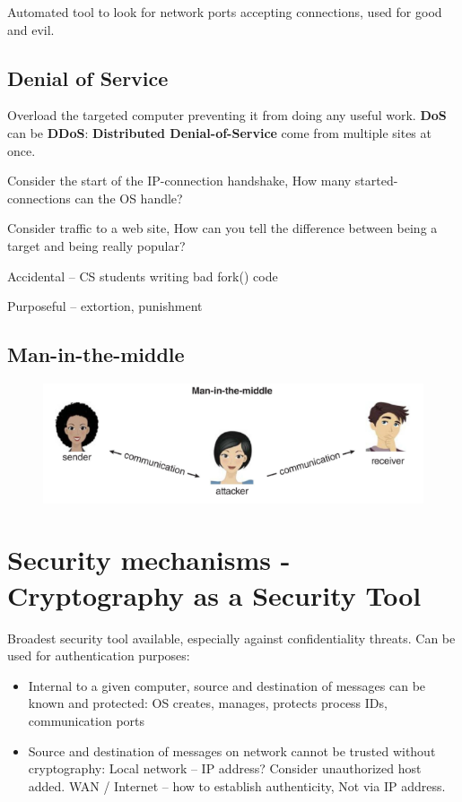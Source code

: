 Automated tool to look for network ports accepting connections, used for good and evil.

\subsection{Denial of Service}

Overload the targeted computer preventing it from doing any useful
work. \textbf{DoS} can be \textbf{DDoS}: \textbf{Distributed Denial-of-Service} come from multiple sites at
once.

Consider the start of the IP-connection handshake, How many started-connections can the OS handle?

Consider traffic to a web site, How can you tell the difference between being a target and
being really popular?

Accidental – CS students writing bad fork() code

Purposeful – extortion, punishment

\subsection{Man-in-the-middle}

\begin{figure}[h!]
    \centering
    \includegraphics[width=0.55\linewidth]{img/mitm.png}
\end{figure}


\section{Security mechanisms - Cryptography as a Security Tool}

Broadest security tool available, especially against confidentiality threats. Can be used for authentication purposes:

\begin{itemize}
    \item Internal to a given computer, source and destination of messages can be known and protected: OS creates, manages, protects process IDs, communication ports
    \item Source and destination of messages on network cannot be trusted without cryptography: Local network – IP address? Consider unauthorized host added. WAN / Internet – how to establish authenticity, Not via IP address.
\end{itemize}

